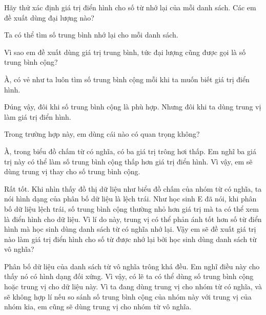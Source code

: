 {\begin{scriptlist}
      \item [Giáo viên:] Hãy thử xác định giá trị điển hình cho số từ nhớ lại của mỗi danh sách. Các em đề xuất dùng đại lượng nào?
      
      \item [Học sinh D:] Ta có thể tìm số trung bình nhớ lại cho mỗi danh sách.
      
      \item [Giáo viên:] Vì sao em đề xuất dùng giá trị trung bình, tức đại lượng cũng được gọi là số trung bình cộng?
      
      \item [Học sinh D:] À, có vẻ như ta luôn tìm số trung bình cộng mỗi khi ta muốn biết giá trị điển hình.
      
      \item [Học sinh E:]  Đúng vậy, đôi khi số trung bình cộng là phù hợp. Nhưng đôi khi ta dùng trung vị làm giá trị điển hình.
      
      \item [Giáo viên:] Trong trường hợp này, em dùng cái nào có quan trọng không?
      
      \item [Học sinh E:] À, trong biểu đồ chấm từ có nghĩa, có ba giá trị trông hơi thấp. Em nghĩ ba giá trị này có thể làm số trung bình cộng thấp hơn giá trị điển hình. Vì vậy, em sẽ dùng trung vị thay cho số trung bình cộng.\vspace{\baselineskip}
      
      \item [Giáo viên:] Rất tốt. Khi nhìn thấy đồ thị dữ liệu như biểu đồ chấm của nhóm từ có nghĩa, ta nói hình dạng của phân bố dữ liệu là lệch trái. Như học sinh E đã nói, khi phân bố dữ liệu lệch trái, số trung bình cộng thường nhỏ hơn giá trị mà ta có thể xem là điển hình cho dữ liệu. Vì lí do này, trung vị có thể phản ánh tốt hơn số từ điển hình mà học sinh dùng danh sách từ có nghĩa nhớ lại. Vậy em sẽ đề xuất giá trị nào làm giá trị điển hình cho số từ được nhớ lại bởi học sinh dùng danh sách từ vô nghĩa?\vspace{2\baselineskip}
      
      \item [Học sinh E:] Phân bố dữ liệu của danh sách từ vô nghĩa trông khá đều. Em nghĩ điều này cho thấy nó có hình dạng đối xứng. Vì vậy, có lẽ ta có thể dùng số trung bình cộng hoặc trung vị cho dữ liệu này. Vì ta đang dùng trung vị cho nhóm từ có nghĩa, và sẽ không hợp lí nếu so sánh số trung bình cộng của nhóm này với trung vị của nhóm kia, em cũng sẽ dùng trung vị cho nhóm từ vô nghĩa.\vspace{\baselineskip}
      

\end{scriptlist}}
